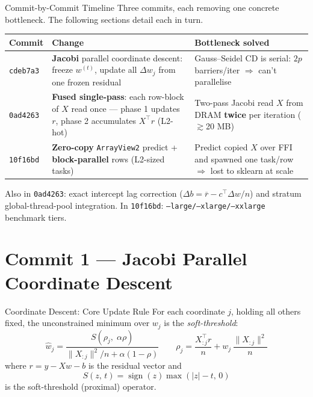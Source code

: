 \documentclass[aspectratio=169]{beamer}
\begin{document}
\begin{frame}{Commit-by-Commit Timeline}
  Three commits, each removing one concrete bottleneck. The following sections
  detail each in turn.
  \vspace{0.5em}
  \begin{center}\small
  \begin{tabular}{lp{5.2cm}p{4.8cm}}
    \hline
    \textbf{Commit} & \textbf{Change} & \textbf{Bottleneck solved} \\
    \hline
    \texttt{cdeb7a3} & \textbf{Jacobi} parallel coordinate descent: freeze
      $w^{(t)}$, update all $\Delta w_j$ from one frozen residual & Gauss--Seidel
      CD is serial: $2p$ barriers/iter $\Rightarrow$ can't parallelise \\[3pt]
    \texttt{0ad4263} & \textbf{Fused single-pass}: each row-block of $X$ read once
      --- phase 1 updates $r$, phase 2 accumulates $X^\top r$ (L2-hot) & Two-pass
      Jacobi read $X$ from DRAM \textbf{twice} per iteration ($\gtrsim$20 MB) \\[3pt]
    \texttt{10f16bd} & \textbf{Zero-copy} \texttt{ArrayView2} predict +
      \textbf{block-parallel} rows (L2-sized tasks) & Predict copied $X$ over FFI
      and spawned one task/row $\Rightarrow$ lost to sklearn at scale \\
    \hline
  \end{tabular}
  \end{center}
  \vspace{0.4em}
  {\footnotesize Also in \texttt{0ad4263}: exact intercept lag correction
   ($\Delta b = \overline{r} - c^\top\!\Delta w / n$) and stratum global-thread-pool
   integration. In \texttt{10f16bd}: \texttt{--large/--xlarge/--xxlarge} benchmark
   tiers.}
\end{frame}

\section{Commit 1 — Jacobi Parallel Coordinate Descent}

\begin{frame}{Coordinate Descent: Core Update Rule}
  For each coordinate $j$, holding all others fixed, the unconstrained minimum
  over $w_j$ is the \emph{soft-threshold}:
  \[
    \hat{w}_j
    = \frac{S\!\left(\rho_j,\;\alpha\rho\right)}{\|X_{:j}\|^2/n + \alpha(1-\rho)}
    \qquad
    \rho_j = \frac{X_{:j}^\top r}{n} + w_j\,\frac{\|X_{:j}\|^2}{n}
  \]
  where $r = y - Xw - b$ is the residual vector and
  \[
    S(z,\,t) = \operatorname{sign}(z)\max(|z|-t,\,0)
  \]
  is the soft-threshold (proximal) operator.
\end{frame}
\end{document}
